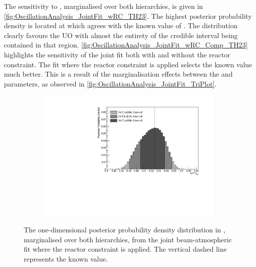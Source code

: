 The sensitivity to , marginalised over both hierarchies, is given in \autoref{fig:OscillationAnalysis_JointFit_wRC_TH23}. The highest posterior probability density is located at  which agrees with the known value of . The distribution clearly favours the UO with almost the entirety of the \quickmath{1\sigma} credible interval being contained in that region. \autoref{fig:OscillationAnalysis_JointFit_wRC_Comp_TH23} highlights the sensitivity of the joint fit both with and without the reactor constraint. The fit where the reactor constraint is applied selects the known value much better. This is a result of the marginalisation effects between the  and  parameters, as observed in \autoref{fig:OscillationAnalysis_JointFit_TriPlot}.

\begin{figure}[h]
  \begin{subfigure}[t]{0.96\textwidth}
    \includegraphics[width=\textwidth, trim={0mm 0mm 0mm 0mm}, clip,page=1]{Figures/OA/JointFit_wRC/Contours_1D_th23_BH_1_wRC_UnSmeared_CredibleInterval.pdf}
  \end{subfigure}
  \caption{The one-dimensional posterior probability density distribution in , marginalised over both hierarchies, from the joint beam-atmospheric fit where the reactor constraint is applied. The vertical dashed line represents the known value.}
  \label{fig:OscillationAnalysis_JointFit_wRC_TH23}
\end{figure}

